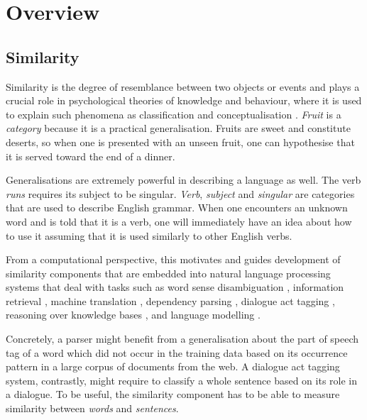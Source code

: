 \chapter{Overview}

\section{Similarity}
\label{sec:similarity}

Similarity is the degree of resemblance between two objects or events \cite{WCS:WCS1282} and plays a crucial role in psychological theories of knowledge and behaviour, where it is used to explain such phenomena as classification and conceptualisation \cite{Tversky1977,1986-13502-00119860101,medin1993respects,Markman1996,hahn1997concepts}. \textit{Fruit} is a \emph{category} because it is a practical generalisation. Fruits are sweet and constitute deserts, so when one is presented with an unseen fruit, one can hypothesise that it is served toward the end of a dinner.

Generalisations are extremely powerful in describing a language as well. The verb \textit{runs} requires its subject to be singular. \textit{Verb}, \textit{subject} and \textit{singular} are categories that are used to describe English grammar. When one encounters an unknown word and is told that it is a verb, one will immediately have an idea about how to use it assuming that it is used similarly to other English verbs.

From a computational perspective, this motivates and guides development of similarity components that are embedded into natural language processing systems that deal with tasks such as
word sense disambiguation \cite{Schutze:1998:AWS:972719.972724},
information retrieval \cite{Salton:1975:VSM:361219.361220,Milajevs:2015:IMN:2808194.2809448},
machine translation \cite{Dagan:1993:CWS:981574.981596},
dependency parsing \cite{hermann-blunsom:2013:ACL2013,andreas-klein:2014:P14-2},
dialogue act tagging \cite{kalchbrenner-blunsom:2013:CVSC,milajevs-purver:2014:CVSC},
reasoning over knowledge bases \cite{NIPS2013_5028},
and language modelling \cite{bengio2006}.

Concretely, a parser might benefit from a generalisation about the part of speech tag of a word which did not occur in the training data based on its occurrence pattern in a large corpus of documents from the web. A dialogue act tagging system, contrastly, might require to classify a whole sentence based on its role in a dialogue. To be useful, the similarity component has to be able to measure similarity between \emph{words} and \emph{sentences}.

